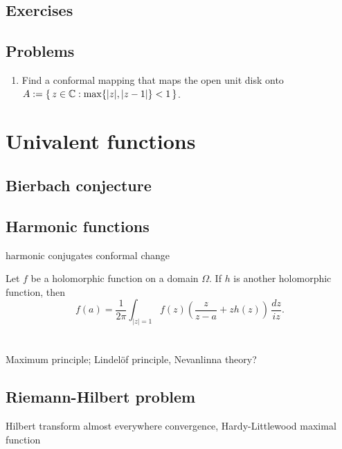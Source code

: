 \documentclass{../note}
\begin{document}
\section*{Exercises}
\begin{prb}
\end{prb}
\begin{prb}
\end{prb}

\section*{Problems}
\begin{enumerate}
\item Find a conformal mapping that maps the open unit disk onto $A:=\{\,z\in\mathbb{C}:\max\{|z|,|z-1|\}<1\,\}$.
\end{enumerate}




\chapter{Univalent functions}
\section{Bierbach conjecture}
\section{Harmonic functions}
harmonic conjugates
conformal change
\begin{prb}
Let $f$ be a holomorphic function on a domain $\Omega$.
If $h$ is another holomorphic function, then
\[f(a)=\frac1{2\pi}\int_{|z|=1}f(z)\left(\frac z{z-a}+zh(z)\right)\,\frac{dz}{iz}.\]
\end{prb}





\chapter{}

Maximum principle; Lindelöf principle,
Nevanlinna theory?

\section{Riemann-Hilbert problem}
Hilbert transform
almost everywhere convergence, Hardy-Littlewood maximal function
\end{document}
